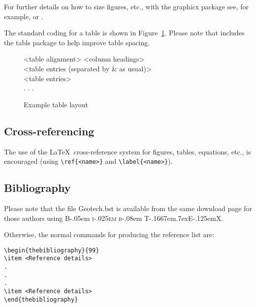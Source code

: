 \documentclass[times]{GeotechAuth}
\newcommand\BibTeX{{\rmfamily B\kern-.05em \textsc{i\kern-.025em b}\kern-.08em
T\kern-.1667em\lower.7ex\hbox{E}\kern-.125emX}}
\begin{document}
For further details on how to size figures, etc., with the
\textsf{graphicx} package see, for example, \cite{R1}
or \cite{R3}.

The standard coding for a table is shown in Figure~\ref{F2}. Please note that \textsf{\journalclass} includes the
\textsf{tabls} package to help improve table spacing.

\begin{figure}
\setlength{\fboxsep}{0pt}%
\setlength{\fboxrule}{0pt}%
\begin{center}
\begin{boxedverbatim}
\begin{table}
\caption{<Table caption>}
\small
\centering
\begin{tabular}{<table alignment>}
\hline
<column headings>\\
\hline
<table entries
(separated by & as usual)>\\
<table entries>\\
.
.
.\\
\hline
\end{tabular}
\end{table}
\end{boxedverbatim}
\end{center}
\caption{Example table layout\label{F2}}
\end{figure}

\subsection{Cross-referencing}
The use of the \LaTeX\ cross-reference system
for figures, tables, equations, etc., is encouraged
(using \verb"\ref{<name>}" and \verb"\label{<name>}").

\subsection{Bibliography}
Please note that the file \textsf{Geotech.bst} is available from
the same download page for those authors using \BibTeX.

Otherwise, the normal commands for producing the reference list
are:
\begin{verbatim}
\begin{thebibliography}{99}
\item <Reference details>
.
.
.
\item <Reference details>
\end{thebibliography}
\end{verbatim}
\end{document}
